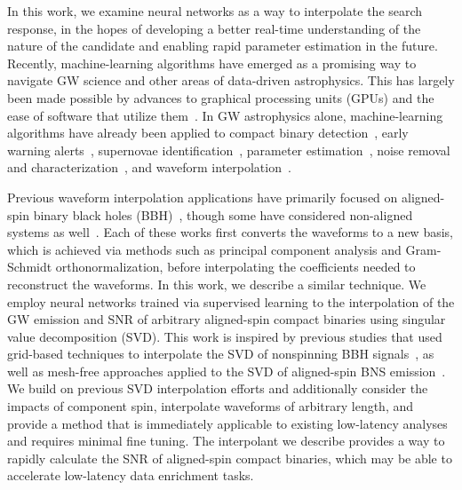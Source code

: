 \documentclass[twocolumn,prd,superscriptaddress,nofootinbib]{revtex4-1}
\begin{document}
In this work, we examine neural networks as a way to interpolate the search
response, in the hopes of developing a better real-time understanding of the
nature of the candidate and enabling rapid parameter estimation in
the future.  Recently, machine-learning algorithms have emerged as a promising
way
to navigate GW science and other areas of data-driven astrophysics.  This has
largely been made possible by advances to graphical processing units (GPUs) and
the ease of software that utilize them~\cite{cuda,NEURIPS2019_9015,xla}. In GW
astrophysics alone, machine-learning algorithms have already been applied to
compact binary
detection~\cite{George:2017pmj,Gabbard:2017lja,Schafer:2022dxv,Mishra:2022ott,Krastev:2019koe,Schafer:2020kor,Schafer:2022dxv,Nousi:2022dwh,Marx:2024wjt},
early warning
alerts~\cite{Wei:2020sfz,Baltus:2021nme,Yu:2021vvm,Baltus:2022pep,Alfaidi:2024ioo}, supernovae
identification~\cite{Astone:2018uge,Antelis:2021qak,LopezPortilla:2020odz},
parameter
estimation~\cite{Gabbard:2019rde,Dax:2021tsq,Chatterjee:2022ggk,Chatterjee:2022dik,Dax:2022pxd,Wong:2023lgb},
noise removal and
characterization~\cite{Vajente:2019ycy,Essick:2020qpo,Saleem:2023hcm}, and waveform interpolation~\cite{Schmidt:2020yuu,Chua:2018woh,Khan:2020fso,Tissino:2022thn,Thomas:2022rmc}.

Previous waveform interpolation applications have primarily focused on aligned-spin
binary black holes (BBH)~\cite{Chua:2018woh,Khan:2020fso,Schmidt:2020yuu}, though some have
considered non-aligned systems as well~\cite{Thomas:2022rmc}. Each of these
works first converts the waveforms to a new basis, which is achieved via
methods such as principal component analysis and Gram-Schmidt
orthonormalization, before interpolating the coefficients needed to reconstruct
the waveforms. In this work, we describe a similar
technique. We employ neural networks trained via
supervised learning to the interpolation of the GW emission and
SNR of arbitrary aligned-spin compact
binaries using singular value decomposition (SVD). This work is inspired by
previous studies that used
grid-based techniques to interpolate the SVD of nonspinning BBH
signals~\cite{Cannon:2011rj}, as well as mesh-free approaches applied to the
SVD of aligned-spin BNS emission~\cite{Pathak:2022ktt}.
We build on previous SVD interpolation
efforts and additionally consider the impacts of component spin,
interpolate waveforms of arbitrary length, and provide a method that is
immediately applicable to existing low-latency analyses and requires minimal
fine tuning.  The interpolant we describe provides a way to rapidly
calculate the SNR of aligned-spin compact binaries, which may be able to
accelerate low-latency data enrichment tasks.
\end{document}
